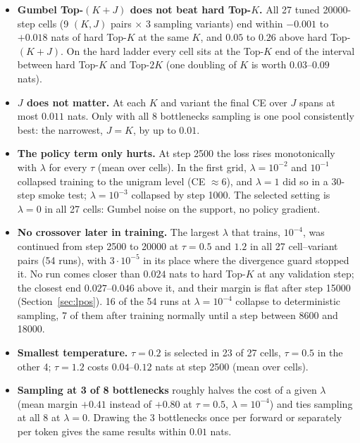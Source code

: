 \documentclass[11pt,a4paper]{article}
\begin{document}
\begin{itemize}[leftmargin=1.2em,itemsep=3pt]
\item \textbf{Gumbel Top-$(K{+}J)$ does not beat hard Top-$K$.} All 27 tuned
  20000-step cells (9 $(K,J)$ pairs $\times$ 3 sampling variants) end within
  $-0.001$ to $+0.018$ nats of hard Top-$K$ at the same $K$, and $0.05$ to $0.26$
  above hard Top-$(K{+}J)$. On the hard ladder every cell sits at the Top-$K$
  end of the interval between hard Top-$K$ and Top-$2K$ (one doubling of $K$
  is worth $0.03$--$0.09$ nats).
\item \textbf{$J$ does not matter.} At each $K$ and variant the final CE over
  $J$ spans at most $0.011$ nats. Only with all 8 bottlenecks sampling is one
  pool consistently best: the narrowest, $J = K$, by up to $0.01$.
\item \textbf{The policy term only hurts.} At step 2500 the loss rises
  monotonically with $\lambda$ for every $\tau$ (mean over cells). In the first
  grid, $\lambda = 10^{-2}$ and $10^{-1}$ collapsed training to the unigram level
  (CE $\approx 6$), and $\lambda = 1$ did so in a 30-step smoke test;
  $\lambda = 10^{-3}$ collapsed by step 1000. The selected
  setting is $\lambda = 0$ in all 27 cells: Gumbel noise on the support, no
  policy gradient.
\item \textbf{No crossover later in training.} The largest $\lambda$ that
  trains, $10^{-4}$, was continued from step 2500 to 20000 at $\tau = 0.5$ and
  $1.2$ in all 27 cell--variant pairs (54 runs), with $3\cdot10^{-5}$ in its place
  where the divergence guard stopped it. No run comes closer than $0.024$ nats to
  hard Top-$K$ at any validation step; the closest end $0.027$--$0.046$ above it,
  and their margin is flat after step 15000 (Section~\ref{sec:lpos}). 16 of the
  54 runs at $\lambda = 10^{-4}$ collapse to deterministic sampling, 7 of them
  after training normally until a step between 8600 and 18000.
\item \textbf{Smallest temperature.} $\tau = 0.2$ is selected in 23 of 27
  cells, $\tau = 0.5$ in the other 4; $\tau = 1.2$ costs $0.04$--$0.12$ nats at
  step 2500 (mean over cells).
\item \textbf{Sampling at 3 of 8 bottlenecks} roughly halves the cost of a
  given $\lambda$ (mean margin $+0.41$ instead of $+0.80$ at $\tau = 0.5$,
  $\lambda = 10^{-4}$) and ties sampling at all 8 at $\lambda = 0$. Drawing the 3
  bottlenecks once per forward or separately per token gives the same results
  within $0.01$ nats.
\end{itemize}
\end{document}
